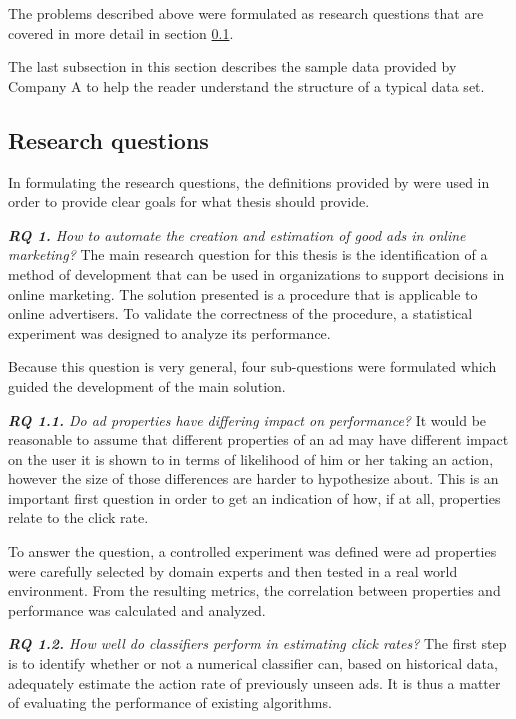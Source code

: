 \documentclass{sig-alternate}
\begin{document}
The problems described above were formulated as research questions that are covered in more detail in section \ref{sec:ResearchQuestions}.

The last subsection in this section describes the sample data provided by Company A to help the reader understand the structure of a typical data set.

\subsection{Research questions}
\label{sec:ResearchQuestions}
In formulating the research questions, the definitions provided by \cite{Shaw2002} were used in order to provide clear goals for what thesis should provide.

\textit{\textbf{RQ 1.} How to automate the creation and estimation of good ads in online marketing?}
The main research question for this thesis is the identification of a method of development that can be used in organizations to support decisions in online marketing. The solution presented is a procedure that is applicable to online advertisers. To validate the correctness of the procedure, a statistical experiment was designed to analyze its performance.

Because this question is very general, four sub-questions were formulated which guided the development of the main solution.

\textit{\textbf{RQ 1.1.} Do ad properties have differing impact on performance?}
It would be reasonable to assume that different properties of an ad may have different impact on the user it is shown to in terms of likelihood of him or her taking an action, however the size of those differences are harder to hypothesize about. This is an important first question in order to get an indication of how, if at all, properties relate to the click rate.

To answer the question, a controlled experiment was defined were ad properties were carefully selected by domain experts and then tested in a real world environment. From the resulting metrics, the correlation between properties and performance was calculated and analyzed.

\textit{\textbf{RQ 1.2.} How well do classifiers perform in estimating click rates?}
The first step is to identify whether or not a numerical classifier can, based on historical data, adequately estimate the action rate of previously unseen ads. It is thus a matter of evaluating the performance of existing algorithms.
\end{document}
